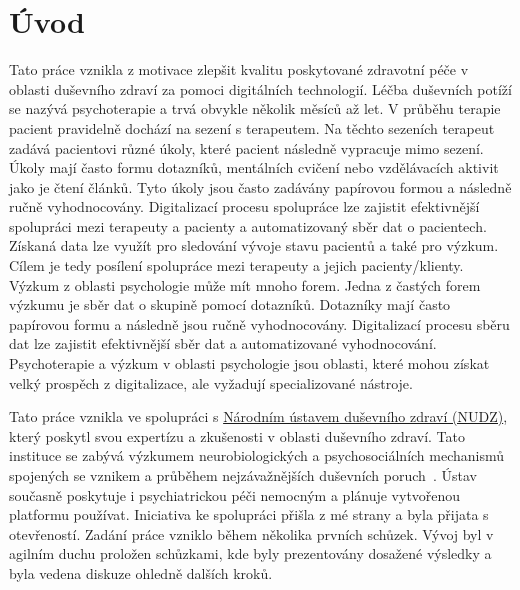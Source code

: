 \chapter*{Úvod}

Tato práce vznikla z motivace zlepšit kvalitu poskytované zdravotní péče v oblasti duševního zdraví za pomoci digitálních technologií.
Léčba duševních potíží se nazývá psychoterapie a trvá obvykle několik měsíců až let.
V průběhu terapie pacient pravidelně dochází na sezení s terapeutem.
Na těchto sezeních terapeut zadává pacientovi různé úkoly, které pacient následně vypracuje mimo sezení.
Úkoly mají často formu dotazníků, mentálních cvičení nebo vzdělávacích aktivit jako je čtení článků.
Tyto úkoly jsou často zadávány papírovou formou a následně ručně vyhodnocovány.
Digitalizací procesu spolupráce lze zajistit efektivnější spolupráci mezi terapeuty a pacienty a automatizovaný sběr dat o pacientech.
Získaná data lze využít pro sledování vývoje stavu pacientů a také pro výzkum.
Cílem je tedy posílení spolupráce mezi terapeuty a jejich pacienty/klienty.
Výzkum z oblasti psychologie může mít mnoho forem.
Jedna z častých forem výzkumu je sběr dat o skupině pomocí dotazníků.
Dotazníky mají často papírovou formu a následně jsou ručně vyhodnocovány.
Digitalizací procesu sběru dat lze zajistit efektivnější sběr dat a automatizované vyhodnocování.
Psychoterapie a výzkum v oblasti psychologie jsou oblasti, které mohou získat velký prospěch z digitalizace, ale vyžadují specializované nástroje.

Tato práce vznikla ve spolupráci s \href{https://www.nudz.cz/}{Národním ústavem duševního zdraví (NUDZ)}, který poskytl svou expertízu a zkušenosti v oblasti duševního zdraví.
Tato instituce se zabývá výzkumem neurobiologických a psychosociálních mechanismů spojených se vznikem a průběhem nejzávažnějších duševních poruch~\cite{nudz-profil}.
Ústav současně poskytuje i psychiatrickou péči nemocným a plánuje vytvořenou platformu používat.
Iniciativa ke spolupráci přišla z mé strany a byla přijata s otevřeností.
Zadání práce vzniklo během několika prvních schůzek.
Vývoj byl v agilním duchu proložen schůzkami, kde byly prezentovány dosažené výsledky a byla vedena diskuze ohledně dalších kroků.

